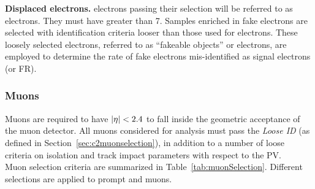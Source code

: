 \textbf {Displaced electrons.}
\Displ electrons passing their selection will be referred to as
\tD electrons.
They must have \pt greater than 7\GeV.
Samples enriched in fake electrons are selected with
identification criteria looser than those used for \tD
electrons. These loosely selected electrons, referred to as
``fakeable objects'' or \fo electrons,
are employed to determine the rate of fake electrons
mis-identified as signal electrons (\fr or FR).
\begin{table}[h!]
  \centering
{\small
  \caption{\label{tab:electronSelection} Requirements for an electron
    to pass each of the defined selection working points. Variables
    defined in Section~\ref{sec:c2variables}.}
    }
\end{table}

\subsubsection{Muons}\label{sec:llmuon}
Muons are required to have
$|\eta|<2.4$ to fall inside the geometric acceptance of the muon
detector.
All muons considered for analysis must pass the \emph{Loose ID} (as
defined in Section~\ref{sec:c2muonselection}), in addition to a number
of loose criteria on isolation and track impact parameters with
respect to the PV.\\
Muon selection criteria are summarized in
Table~\ref{tab:muonSelection}. Different selections are applied to prompt and \displ muons.


